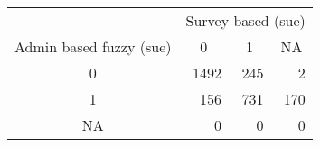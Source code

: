 \begin{tabular}{crrr}
      & \multicolumn{3}{c}{Survey based (sue)} \\
\cmidrule{2-4}Admin based fuzzy (sue) & \multicolumn{1}{c}{0} & \multicolumn{1}{c}{1} & \multicolumn{1}{c}{NA} \\
\cmidrule{2-4}0     & 1492  & 245   & 2 \\
1     & 156   & 731   & 170 \\
NA    & 0     & 0     & 0 \\
\cmidrule{2-4}\end{tabular}%
